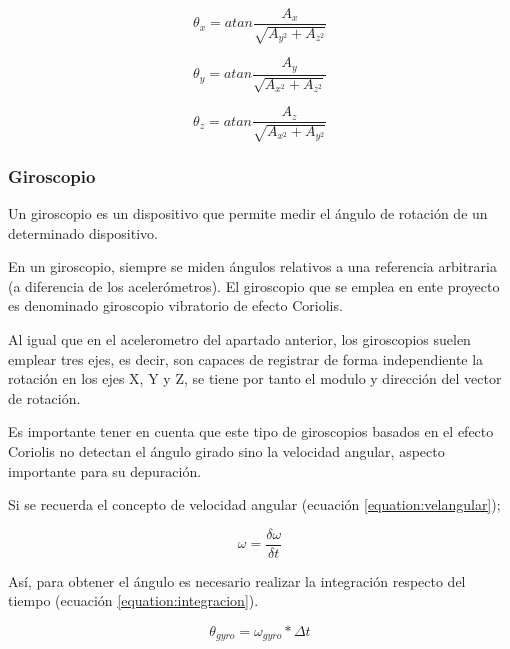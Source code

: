 \begin{equation}
\theta_{x} = atan\frac{A_{x}}{\sqrt{A_{y^2}+A_{z^2}}}
\end{equation}

\begin{equation}
\theta_{y} = atan\frac{A_{y}}{\sqrt{A_{x^2}+A_{z^2}}}
\end{equation}

\begin{equation}
\theta_{z} = atan\frac{A_{z}}{\sqrt{A_{x^2}+A_{y^2}}}
\end{equation}

\subsubsection{Giroscopio}
Un giroscopio es un dispositivo que permite medir el ángulo de rotación de un determinado dispositivo. \newline

En un giroscopio, siempre se miden ángulos relativos a una referencia arbitraria (a diferencia de los acelerómetros). El giroscopio que se emplea en ente proyecto es denominado giroscopio vibratorio de efecto Coriolis. \newline

Al igual que en el acelerometro del apartado anterior, los giroscopios suelen emplear tres ejes, es decir, son capaces de registrar de forma independiente la rotación en los ejes X, Y y Z, se tiene por tanto el modulo y dirección del vector de rotación. \newline

Es importante tener en cuenta que este tipo de giroscopios basados en el efecto Coriolis no detectan el ángulo girado sino la velocidad angular, aspecto importante para su depuración. \newline

Si se recuerda el concepto de velocidad angular (ecuación \ref{equation:velangular});

\begin{equation} \label{equation:velangular}
\omega = \frac{\delta \omega}{\delta t}
\end{equation}

Así, para obtener el ángulo es necesario realizar la integración respecto del tiempo (ecuación \ref{equation:integracion}).

\begin{equation}\label{equation:integracion}
\theta_{gyro} = \omega_{gyro}*\Delta t
\end{equation}

